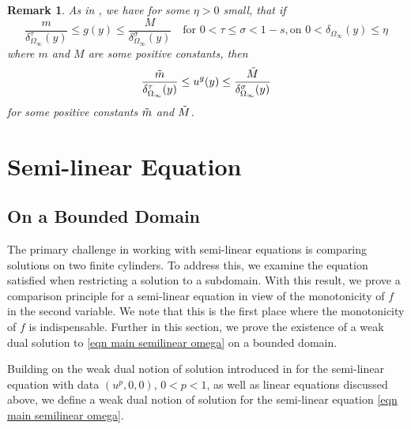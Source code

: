 \documentclass{amsart}
\newtheorem{remark}[theorem]{Remark}
\begin{document}
\begin{remark}
    As in \cite[Remark 9, Remark 10]{Abatangelo2015LargesHarmonic}, we have for some $\eta>0$ small, that if
    \begin{equation*}
        \frac{m}{\delta^{\tau}_{\Omega_{\infty}}(y)}\leq g(y)\leq \frac{M}{\delta^{\sigma}_{\Omega_{\infty}}(y)}\quad \text{for } 0<\tau\leq \sigma<1-s,\text{on } 0<\delta_{\Omega_{\infty}}(y)\leq \eta    \end{equation*}
        where $m$ and $M$ are some positive constants, then 
        \begin{equation*}
            \frac{\Tilde{m}}{\delta^{\tau}_{\Omega_{\infty}}(y)}\leq u^{g}(y)\leq \frac{\Tilde{M}}{\delta_{\Omega_{\infty}}^{\sigma}(y)}
        \end{equation*}
        for some positive constants $\Tilde{m}$ and $\Tilde{M}$.
\end{remark}



\section{Semi-linear Equation}\label{section semilinear}
\subsection{On a Bounded Domain}
The primary challenge in working with semi-linear equations is comparing solutions on two finite cylinders. To address this, we examine the equation satisfied when restricting a solution to a subdomain. With this result,
we prove a comparison principle for a semi-linear equation in view of the monotonicity of $f$ in the second variable. We note that this is the first place where the monotonicity of $f$ is indispensable.  Further in this section, we prove the existence of a weak dual solution to \eqref{eqn main semilinear omega} on a bounded domain. 

Building on the weak dual notion of solution introduced in \cite{BonforteFigalliVazquez2018} for the semi-linear equation with data $(u^{p},0,0)$, $0<p<1$, as well as linear equations discussed above,  we define a weak dual notion of solution for the semi-linear equation \eqref{eqn main semilinear omega}. 
\end{document}
